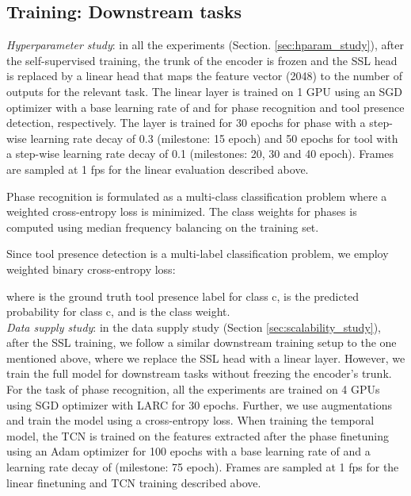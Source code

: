 \documentclass[times,twocolumn,final]{elsarticle}
\begin{document}
\subsection{Training: Downstream tasks}

\textit{Hyperparameter study}: in all the experiments (Section. \ref{sec:hparam_study}), after the self-supervised training, the trunk of the encoder is frozen and the SSL head is replaced by a linear head that maps the feature vector (2048) to the number of outputs for the relevant task. The linear layer is trained on 1 GPU using an SGD optimizer with a base learning rate of  and  for phase recognition and tool presence detection, respectively. The layer is trained for 30 epochs for phase with a step-wise learning rate decay of 0.3 (milestone: 15 epoch) and 50 epochs for tool with a step-wise learning rate decay of 0.1 (milestones: 20, 30 and 40 epoch). Frames are sampled at 1 fps for the linear evaluation described above.

Phase recognition is formulated as a multi-class classification problem where a weighted cross-entropy loss is minimized. The class weights for phases is computed using median frequency balancing \citep{DepthFergusMFB} on the training set.

Since tool presence detection is a multi-label classification problem, we employ weighted binary cross-entropy loss:


where  is the ground truth tool presence label for class c,  is the predicted probability for class c, and  is the class weight.
\\

\textit{Data supply study}: in the data supply study (Section \ref{sec:scalability_study}), after the SSL training, we follow a similar downstream training setup to the one mentioned above, where we replace the SSL head with a linear layer. However, we train the full model for downstream tasks without freezing the encoder's trunk. For the task of phase recognition, all the experiments are trained on 4 GPUs using SGD optimizer with LARC \citep{you2017large} for 30 epochs. Further, we use augmentations and train the model using a cross-entropy loss. When training the temporal model, the TCN is trained on the features extracted after the phase finetuning using an Adam optimizer \citep{kingma2014adam} for 100 epochs with a base learning rate of  and a learning rate decay of  (milestone: 75 epoch). Frames are sampled at 1 fps for the linear finetuning and TCN training described above.
\end{document}
